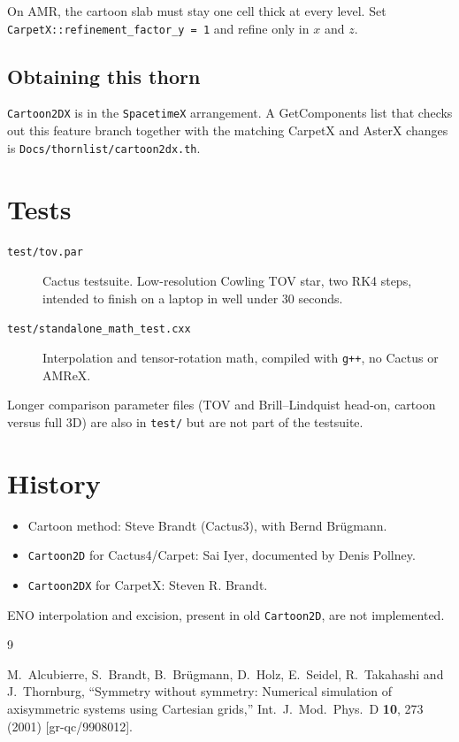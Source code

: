On AMR, the cartoon slab must stay one cell thick at every level. Set
\texttt{CarpetX::refinement\_factor\_y = 1} and refine only in $x$ and
$z$.

\subsection{Obtaining this thorn}

\texttt{Cartoon2DX} is in the \texttt{SpacetimeX} arrangement. A
GetComponents list that checks out this feature branch together with
the matching CarpetX and AsterX changes is
\texttt{Docs/thornlist/cartoon2dx.th}.

\section{Tests}

\begin{description}
\item[\texttt{test/tov.par}] Cactus testsuite. Low-resolution Cowling
  TOV star, two RK4 steps, intended to finish on a laptop in well under
  30 seconds.
\item[\texttt{test/standalone\_math\_test.cxx}] Interpolation and
  tensor-rotation math, compiled with \texttt{g++}, no Cactus or AMReX.
\end{description}
Longer comparison parameter files (TOV and Brill--Lindquist head-on,
cartoon versus full 3D) are also in \texttt{test/} but are not part of
the testsuite.

\section{History}

\begin{itemize}
\item Cartoon method: Steve Brandt (Cactus3), with Bernd Br\"ugmann.
\item \texttt{Cartoon2D} for Cactus4/Carpet: Sai Iyer, documented by
  Denis Pollney.
\item \texttt{Cartoon2DX} for CarpetX: Steven R. Brandt.
\end{itemize}

ENO interpolation and excision, present in old \texttt{Cartoon2D}, are
not implemented.

\begin{thebibliography}{9}

  M.~Alcubierre, S.~Brandt, B.~Br\"ugmann, D.~Holz, E.~Seidel,
  R.~Takahashi and J.~Thornburg,
  ``Symmetry without symmetry: Numerical simulation of axisymmetric
  systems using Cartesian grids,''
  Int.\ J.\ Mod.\ Phys.\ D {\bf 10}, 273 (2001)
  [gr-qc/9908012].

\end{thebibliography}




